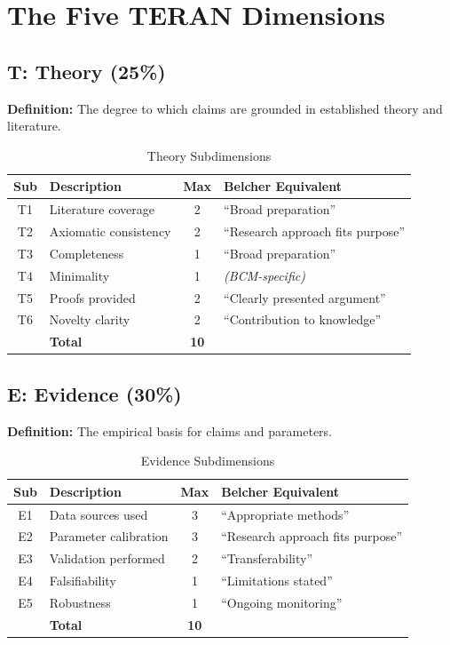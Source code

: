 \documentclass[11pt,a4paper]{article}
\begin{document}

\section{The Five TERAN Dimensions}
\label{sec:dimensions}

\subsection{T: Theory (25\%)}

\textbf{Definition:} The degree to which claims are grounded in established theory and literature.

\begin{table}[h]
\centering
\caption{Theory Subdimensions}
\begin{tabular}{clcp{6cm}}
\toprule
\textbf{Sub} & \textbf{Description} & \textbf{Max} & \textbf{Belcher Equivalent} \\
\midrule
T1 & Literature coverage & 2 & ``Broad preparation'' \\
T2 & Axiomatic consistency & 2 & ``Research approach fits purpose'' \\
T3 & Completeness & 1 & ``Broad preparation'' \\
T4 & Minimality & 1 & \textit{(BCM-specific)} \\
T5 & Proofs provided & 2 & ``Clearly presented argument'' \\
T6 & Novelty clarity & 2 & ``Contribution to knowledge'' \\
\midrule
& \textbf{Total} & \textbf{10} & \\
\bottomrule
\end{tabular}
\end{table}

\subsection{E: Evidence (30\%)}

\textbf{Definition:} The empirical basis for claims and parameters.

\begin{table}[h]
\centering
\caption{Evidence Subdimensions}
\begin{tabular}{clcp{6cm}}
\toprule
\textbf{Sub} & \textbf{Description} & \textbf{Max} & \textbf{Belcher Equivalent} \\
\midrule
E1 & Data sources used & 3 & ``Appropriate methods'' \\
E2 & Parameter calibration & 3 & ``Research approach fits purpose'' \\
E3 & Validation performed & 2 & ``Transferability'' \\
E4 & Falsifiability & 1 & ``Limitations stated'' \\
E5 & Robustness & 1 & ``Ongoing monitoring'' \\
\midrule
& \textbf{Total} & \textbf{10} & \\
\bottomrule
\end{tabular}
\end{table}
\end{document}
